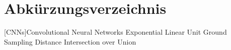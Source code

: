 \chapter*{Abkürzungsverzeichnis}

\begin{acronym}[WYSISWG] %


	[CNNs]{Convolutional Neural Networks}
	 {Exponential Linear Unit}
	 {Ground Sampling Distance}
	 {Intersection over Union}

\end{acronym}

